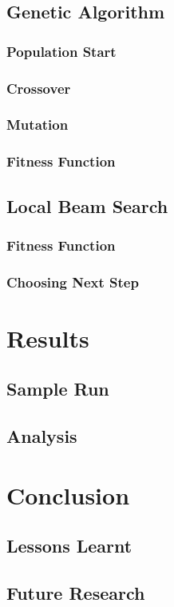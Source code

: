 \documentclass[12pt]{article}
\begin{document}
\subsection{Genetic Algorithm}
\subsubsection{Population Start}
\subsubsection{Crossover}
\subsubsection{Mutation}
\subsubsection{Fitness Function}
\subsection{Local Beam Search}
\subsubsection{Fitness Function}
\subsubsection{Choosing Next Step}


\section{Results}
\subsection{Sample Run}
\subsection{Analysis}


\section{Conclusion}
\subsection{Lessons Learnt}
\subsection{Future Research}
\end{document}
